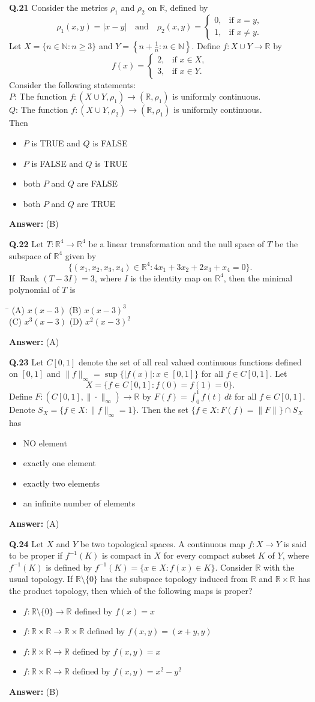 \documentclass[11pt,a4paper]{article}
\newcommand{\optsfourA}[4]{%
  \begin{tabbing}
    \hspace{0.48\linewidth}\=\kill
    (A) #1 \> (B) #2 \\[2pt]
    (C) #3 \> (D) #4
  \end{tabbing}%
}
\newcommand{\optslistA}[4]{%
  \begin{itemize}
    \setlength{\itemsep}{2pt}\setlength{\parskip}{0pt}
    \item[(A)] #1
    \item[(B)] #2
    \item[(C)] #3
    \item[(D)] #4
  \end{itemize}%
}
\newcommand{\ans}[1]{\textbf{Answer:} #1\par\medskip}
\begin{document}
\textbf{Q.21} Consider the metrics $\rho_1$ and $\rho_2$ on $\mathbb{R}$, defined by
\[
  \rho_1(x, y) = |x - y| \quad \text{and} \quad \rho_2(x, y) = \begin{cases} 0, & \text{if } x = y, \\ 1, & \text{if } x \ne y. \end{cases}
\]
Let $X = \{n \in \mathbb{N} : n \ge 3\}$ and $Y = \left\{n + \frac{1}{n} : n \in \mathbb{N}\right\}$. Define $f : X \cup Y \to \mathbb{R}$ by
\[
  f(x) = \begin{cases} 2, & \text{if } x \in X, \\ 3, & \text{if } x \in Y. \end{cases}
\]
Consider the following statements:\\
$P$: The function $f : (X \cup Y, \rho_1) \to (\mathbb{R}, \rho_1)$ is uniformly continuous.\\
$Q$: The function $f : (X \cup Y, \rho_2) \to (\mathbb{R}, \rho_1)$ is uniformly continuous.\\
Then
\optslistA{$P$ is TRUE and $Q$ is FALSE}{$P$ is FALSE and $Q$ is TRUE}{both $P$ and $Q$ are FALSE}{both $P$ and $Q$ are TRUE}
\ans{(B)}

\textbf{Q.22} Let $T : \mathbb{R}^4 \to \mathbb{R}^4$ be a linear transformation and the null space of $T$ be the subspace of $\mathbb{R}^4$ given by
\[
  \{(x_1, x_2, x_3, x_4) \in \mathbb{R}^4 : 4x_1 + 3x_2 + 2x_3 + x_4 = 0\}.
\]
If $\operatorname{Rank}(T - 3I) = 3$, where $I$ is the identity map on $\mathbb{R}^4$, then the minimal polynomial of $T$ is
\optsfourA{$x(x - 3)$}{$x(x - 3)^3$}{$x^3(x - 3)$}{$x^2(x - 3)^2$}
\ans{(A)}

\textbf{Q.23} Let $C[0, 1]$ denote the set of all real valued continuous functions defined on $[0, 1]$ and $\|f\|_\infty = \sup\{|f(x)| : x \in [0, 1]\}$ for all $f \in C[0, 1]$. Let
\[
  X = \{f \in C[0, 1] : f(0) = f(1) = 0\}.
\]
Define $F : (C[0, 1], \|\cdot\|_\infty) \to \mathbb{R}$ by $F(f) = \int_0^1 f(t)\,dt$ for all $f \in C[0, 1]$. Denote $S_X = \{f \in X : \|f\|_\infty = 1\}$. Then the set $\{f \in X : F(f) = \|F\|\} \cap S_X$ has
\optslistA{NO element}{exactly one element}{exactly two elements}{an infinite number of elements}
\ans{(A)}

\textbf{Q.24} Let $X$ and $Y$ be two topological spaces. A continuous map $f : X \to Y$ is said to be proper if $f^{-1}(K)$ is compact in $X$ for every compact subset $K$ of $Y$, where $f^{-1}(K)$ is defined by $f^{-1}(K) = \{x \in X : f(x) \in K\}$. Consider $\mathbb{R}$ with the usual topology. If $\mathbb{R} \setminus \{0\}$ has the subspace topology induced from $\mathbb{R}$ and $\mathbb{R} \times \mathbb{R}$ has the product topology, then which of the following maps is proper?
\optslistA{$f : \mathbb{R} \setminus \{0\} \to \mathbb{R}$ defined by $f(x) = x$}{$f : \mathbb{R} \times \mathbb{R} \to \mathbb{R} \times \mathbb{R}$ defined by $f(x, y) = (x + y, y)$}{$f : \mathbb{R} \times \mathbb{R} \to \mathbb{R}$ defined by $f(x, y) = x$}{$f : \mathbb{R} \times \mathbb{R} \to \mathbb{R}$ defined by $f(x, y) = x^2 - y^2$}
\ans{(B)}
\end{document}

